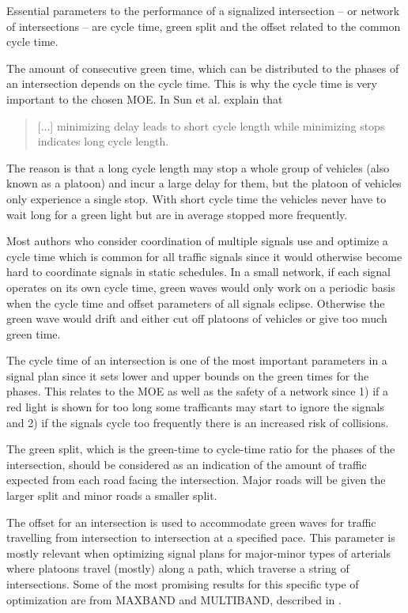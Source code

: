 \label{sec:theproblem}

Essential parameters to the performance of a signalized intersection
-- or network of intersections -- are cycle time, green split and the
offset related to the common cycle time.

The amount of consecutive green time, which can be distributed to the
phases of an intersection depends on the cycle time. This is why the
cycle time is very important to the chosen MOE. In \cite{41} Sun et
al. explain that 

\begin{quote}[...] minimizing delay leads to short cycle length while
minimizing stops indicates long cycle length.
\end{quote}

The reason is that a long cycle length may stop a whole group of
vehicles (also known as a platoon) and incur a large delay for them,
but the platoon of vehicles only experience a single stop. With short
cycle time the vehicles never have to wait long for a green light but
are in average stopped more frequently.

Most authors who consider coordination of multiple signals use and
optimize a cycle time which is common for all traffic signals since it
would otherwise become hard to coordinate signals in static
schedules. In a small network, if each signal operates on its own
cycle time, green waves would only work on a periodic basis when the
cycle time and offset parameters of all signals eclipse. Otherwise the
green wave would drift and either cut off platoons of vehicles or give
too much green time.

The cycle time of an intersection is one of the most important
parameters in a signal plan since it sets  lower and upper bounds on
the green times for the phases. This relates to the MOE as well as the
safety of a network since 1) if a red light is shown for too long some
trafficants may start to ignore the signals and 2) if the signals
cycle too frequently there is an increased risk of collisions.

The green split, which is the green-time to cycle-time ratio for the
phases of the intersection, should be considered as an indication of
the amount of traffic expected from each road facing the
intersection. Major roads will be given the larger split and minor
roads a smaller split.

The offset for an intersection is used to accommodate green waves for
traffic travelling from intersection to intersection at a specified
pace. This parameter is mostly relevant when optimizing signal plans
for major-minor types of arterials where platoons travel (mostly)
along a path, which traverse a string of intersections. Some of the
most promising results for this specific type of optimization are from
MAXBAND and MULTIBAND, described in \cite{37}.

